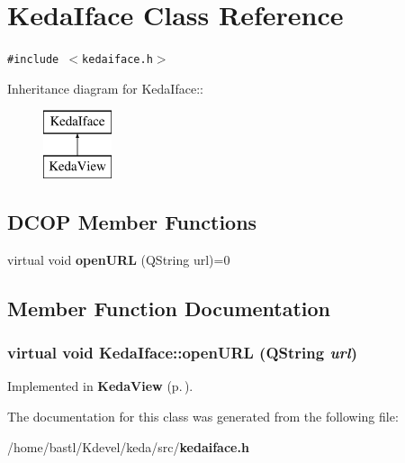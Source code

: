 \section{Keda\-Iface Class Reference}
\label{classKedaIface}
{\tt \#include $<$kedaiface.h$>$}

Inheritance diagram for Keda\-Iface::\begin{figure}[H]
\begin{center}
\leavevmode
\includegraphics[height=2cm]{classKedaIface}
\end{center}
\end{figure}
\subsection*{DCOP Member Functions}
\begin{CompactItemize}
\item 
virtual void {\bf open\-URL} (QString url)=0
\end{CompactItemize}


\subsection{Member Function Documentation}
\subsubsection{\setlength{\rightskip}{0pt plus 5cm}virtual void Keda\-Iface::open\-URL (QString {\em url})\hspace{0.3cm}{\tt  [pure virtual]}}\label{classKedaIface_3deb991ea51d92a58332714d156f1389}




Implemented in {\bf Keda\-View} {\rm (p.\,\pageref{classKedaView_1d669cfc5a2d59fafee1b0c99df3a957})}.

The documentation for this class was generated from the following file:\begin{CompactItemize}
\item 
/home/bastl/Kdevel/keda/src/{\bf kedaiface.h}\end{CompactItemize}
